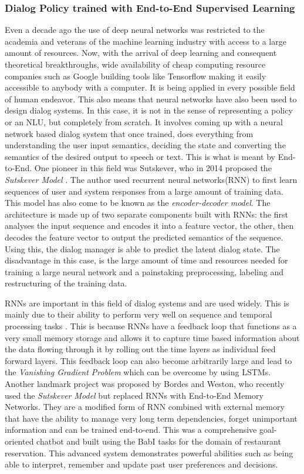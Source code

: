 \documentclass[12pt]{extarticle}
\numberwithin{equation}{section}
\begin{document}
	\subsubsection{Dialog Policy trained with End-to-End Supervised Learning}
	Even a decade ago the use of deep neural networks was restricted to the academia and veterans of the machine learning industry with access to a large amount of resources. Now, with the arrival of deep learning and consequent theoretical breakthroughs, wide availability of cheap computing resource companies such as Google building tools like Tensorflow\cite{tensorflow} making it easily accessible to anybody with a computer. It is being applied in every possible field of human endeavor. This also means that neural networks have also been used to design dialog systems. In this case, it is not in the sense of representing a policy or an NLU, but completely from scratch. It involves coming up with a neural network based dialog system that once trained, does everything from understanding the user input semantics, deciding the state and converting the semantics of the desired output to speech or text. This is what is meant by End-to-End. One pioneer in this field was Sutskever, who in 2014 proposed the \textit{Sutskever Model} \cite{Sutskever_seq_2seq}. The author used recurrent neural networks(RNN) to first learn sequences of user and system responses from a large amount of training data. This model has also come to be known as the \textit{encoder-decoder model}. The architecture is made up of two separate components built with RNNs: the first analyses the input sequence and encodes it into a feature vector, the other, then decodes the feature vector to output the predicted semantics of the sequence. Using this, the dialog manager is able to predict the latent dialog state. The disadvantage in this case, is the large amount of time and resources needed for training a large neural network and a painstaking preprocessing, labeling and restructuring of the training data.
	
	RNNs are important in this field of dialog systems and are used widely. This is mainly due to their ability to perform very well on sequence and temporal processing tasks \cite{karpathy_rnn}. This is because RNNs have a feedback loop that functions as a very small memory storage and allows it to capture time based information about the data flowing through it by rolling out the time layers as individual feed forward layers. This feedback loop can also become arbitrarily large and lead to the \textit{Vanishing Gradient Problem}\cite{hochreiter1998vanishing} which can be overcome by using LSTMs\cite{hochreiter1997long}. Another landmark project was proposed by Bordes and Weston, who recently used the \textit{Sutskever Model} but replaced RNNs with End-to-End Memory Networks\cite{Sukhbaatar_end2end_mem_net}. They are a modified form of RNN combined with external memory that have the ability to manage very long term dependencies, forget unimportant information and can be trained end-to-end. This was a comprehensive goal-oriented chatbot and built using the BabI tasks\cite{babl} for the domain of restaurant reservation\cite{bordes_weston_e2e}. This advanced system demonstrates powerful abilities such as being able to interpret, remember and update past user preferences and decisions.
\end{document}
